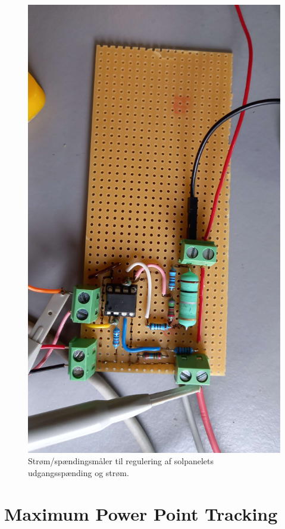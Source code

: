 \documentclass[../main.tex]{subfiles}
\begin{document}
        \begin{figure}[H]
        \includegraphics[scale = 0.08]{Dokumentation/Pictures/PV_strømmåler.jpg}
        \caption{Strøm/spændingsmåler til regulering af solpanelets udgangsspænding og strøm.}
        \label{pic: MPPTbuck}
        \end{figure}
        

\section{Maximum Power Point Tracking}
\end{document}

